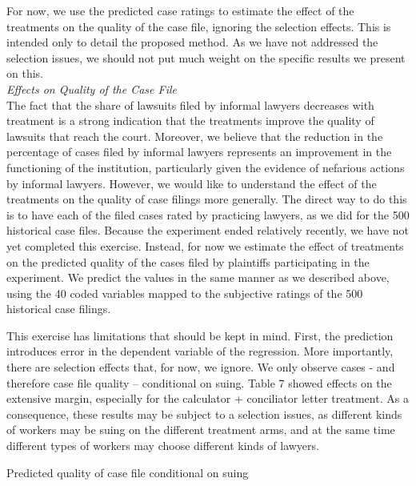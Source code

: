 \documentclass[12 pt]{article}
\begin{document}
For now, we use the predicted case ratings to estimate the effect of the treatments on the quality of the case file, ignoring the selection effects. This is intended only to detail the proposed method. As we have not addressed the selection issues, we should not put much weight on the specific results we present on this. 
\\

\noindent\emph{Effects on Quality of the Case File}\\
The fact that the share of lawsuits filed by informal lawyers decreases with treatment is a strong indication that the treatments improve the quality of lawsuits that reach the court. Moreover, we believe that the reduction in the percentage of cases filed by informal lawyers represents an improvement in the functioning of the institution, particularly given the evidence of nefarious actions by informal lawyers. However, we would like to understand the effect of the treatments on the quality of case filings more generally. The direct way to do this is to have each of the filed cases rated by practicing lawyers, as we did for the 500 historical case files. Because the experiment ended relatively recently, we have not yet completed this exercise. Instead, for now we estimate the effect of treatments on the predicted quality of the cases filed by plaintiffs participating in the experiment. We predict the values in the same manner as we described above, using the 40 coded variables mapped to the subjective ratings of the 500 historical case filings. 

This exercise has limitations that should be kept in mind. First, the prediction introduces error in the dependent variable of the regression. More importantly, there are selection effects that, for now, we ignore. We only observe cases - and therefore case file quality – conditional on suing. Table 7 showed effects on the extensive margin, especially for the calculator + conciliator letter treatment. As a consequence, these results may be subject to a selection issues, as different kinds of workers may be suing on the different treatment arms, and at the same time different types of workers may choose different kinds of lawyers.
\\
\begin{table}[!ht]
    \caption{Predicted quality of case file conditional on suing} 
    \label{tab:10_TE_quality_postlasso}
    \center
    \scriptsize{}
  
\end{table}
\end{document}
